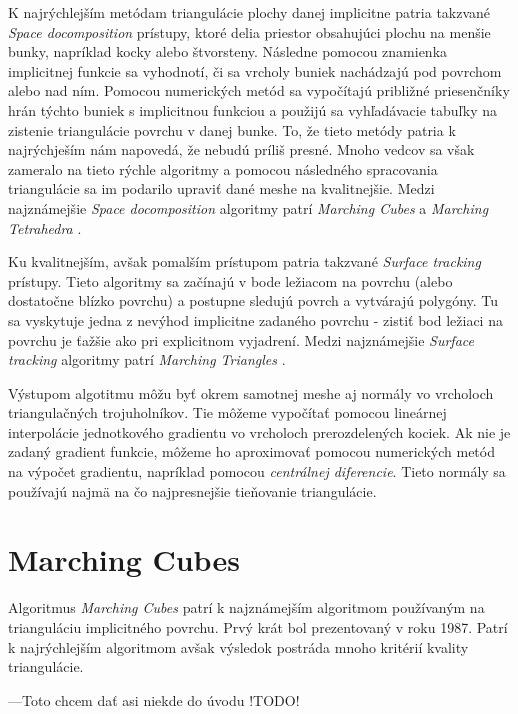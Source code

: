K najrýchlejším metódam triangulácie plochy danej implicitne patria takzvané \textit{Space docomposition}
prístupy, ktoré delia priestor obsahujúci plochu na menšie bunky, napríklad kocky alebo štvorsteny.
Následne pomocou znamienka implicitnej funkcie sa vyhodnotí, či sa vrcholy buniek nachádzajú pod povrchom 
alebo nad ním. Pomocou numerických metód sa vypočítajú približné priesenčníky hrán týchto buniek s 
implicitnou funkciou a použijú sa vyhľadávacie tabuľky na zistenie triangulácie povrchu v danej bunke. 
To, že tieto metódy patria k najrýchješím nám napovedá, že nebudú príliš presné. Mnoho vedcov sa
však zameralo na tieto rýchle algoritmy a pomocou následného spracovania triangulácie sa im 
podarilo upraviť dané meshe na kvalitnejšie. Medzi najznámejšie \textit{Space docomposition} algoritmy
patrí \textit{Marching Cubes} \cite{lorensen1987marching} a \textit{Marching Tetrahedra} \cite{doi1991efficient}.

Ku kvalitnejším, avšak pomalším prístupom patria takzvané \textit{Surface tracking} prístupy.
Tieto algoritmy sa začínajú v bode ležiacom na povrchu (alebo dostatočne blízko povrchu) a 
postupne sledujú povrch a vytvárajú polygóny. Tu sa vyskytuje jedna z nevýhod implicitne zadaného
povrchu - zistiť bod ležiaci na povrchu je ťažšie ako pri explicitnom vyjadrení. Medzi najznámejšie 
\textit{Surface tracking} algoritmy patrí \textit{Marching Triangles} \cite{hilton1996marching}.

Výstupom algotitmu môžu byť okrem samotnej meshe aj normály vo vrcholoch triangulačných trojuholníkov. 
Tie môžeme vypočítať pomocou lineárnej interpolácie jednotkového gradientu vo vrcholoch prerozdelených 
kociek. 
Ak nie je zadaný gradient funkcie, môžeme ho aproximovať pomocou numerických metód na výpočet gradientu,
napríklad pomocou \textit{centrálnej diferencie}.
Tieto normály sa používajú najmä na čo najpresnejšie tieňovanie triangulácie.

\section{Marching Cubes}

Algoritmus \textit{Marching Cubes} \cite{lorensen1987marching} patrí k najznámejším algoritmom používaným
na trianguláciu implicitného povrchu. Prvý krát bol prezentovaný v roku 1987. Patrí k najrýchlejším
algoritmom avšak výsledok postráda mnoho kritérií kvality triangulácie. 

---Toto chcem dať asi niekde do úvodu !TODO!


